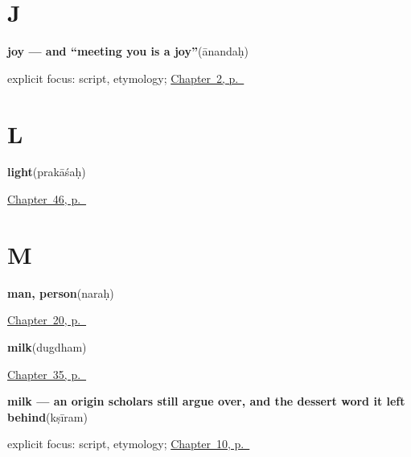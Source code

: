 \section*{J}

\noindent\begin{minipage}[t]{\linewidth}
\raggedright
\textbf{joy — and \textquotedblleft{}meeting you is a joy\textquotedblright{}}\enspace\emph{}\enspace(ānandaḥ)\par
\footnotesize explicit focus: script, etymology; \hyperref[ch:introductions]{Chapter~2, p.~\pageref*{ch:introductions}}
\end{minipage}\par\smallskip

\section*{L}

\noindent\begin{minipage}[t]{\linewidth}
\raggedright
\textbf{light}\enspace\emph{}\enspace(prakāśaḥ)\par
\footnotesize \hyperref[ch:sa-sun-and-shade]{Chapter~46, p.~\pageref*{ch:sa-sun-and-shade}}
\end{minipage}\par\smallskip

\section*{M}

\noindent\begin{minipage}[t]{\linewidth}
\raggedright
\textbf{man, person}\enspace\emph{}\enspace(naraḥ)\par
\footnotesize \hyperref[ch:sa-people]{Chapter~20, p.~\pageref*{ch:sa-people}}
\end{minipage}\par\smallskip

\noindent\begin{minipage}[t]{\linewidth}
\raggedright
\textbf{milk}\enspace\emph{}\enspace(dugdham)\par
\footnotesize \hyperref[ch:sa-house]{Chapter~35, p.~\pageref*{ch:sa-house}}
\end{minipage}\par\smallskip

\noindent\begin{minipage}[t]{\linewidth}
\raggedright
\textbf{milk — an origin scholars still argue over, and the dessert word it left behind}\enspace\emph{}\enspace(kṣīram)\par
\footnotesize explicit focus: script, etymology; \hyperref[ch:sa-request-nouns]{Chapter~10, p.~\pageref*{ch:sa-request-nouns}}
\end{minipage}\par\smallskip


